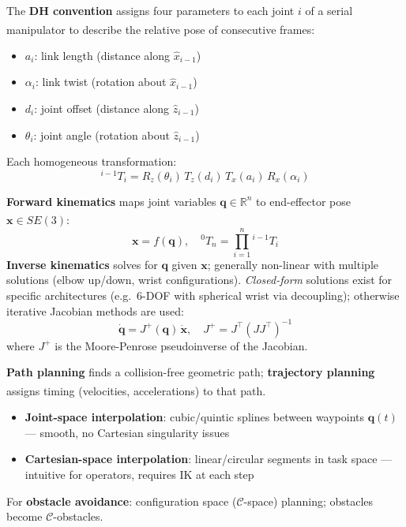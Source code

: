 \begin{tcbitemize}[ skin=sectionraster ]
    \tcbitem[title={Denavit-Hartenberg (DH) Parameters}, raster multicolumn=3]
    The \textbf{DH convention} assigns four parameters to each joint $i$ of a serial manipulator to describe the relative pose of consecutive frames\textsuperscript{\cite[][pp.~45--70]{sicilianoRobotics2009}}:
    \begin{itemize}
        \item $a_i$: link length (distance along $\hat{x}_{i-1}$)
        \item $\alpha_i$: link twist (rotation about $\hat{x}_{i-1}$)
        \item $d_i$: joint offset (distance along $\hat{z}_{i-1}$)
        \item $\theta_i$: joint angle (rotation about $\hat{z}_{i-1}$)
    \end{itemize}
    Each homogeneous transformation:
    \begin{equation}
        {}^{i-1}T_i = R_z(\theta_i)\,T_z(d_i)\,T_x(a_i)\,R_x(\alpha_i)
    \end{equation}

    \tcbitem[title={Forward and Inverse Kinematics}, raster multicolumn=3]
    \textbf{Forward kinematics} maps joint variables $\mathbf{q} \in \mathbb{R}^n$ to end-effector pose $\mathbf{x} \in SE(3)$\textsuperscript{\cite[][pp.~80--100]{sicilianoRobotics2009}}:
    \begin{equation}
        \mathbf{x} = f(\mathbf{q}), \quad {}^0T_n = \prod_{i=1}^{n} {}^{i-1}T_i
    \end{equation}
    \textbf{Inverse kinematics} solves for $\mathbf{q}$ given $\mathbf{x}$; generally non-linear with multiple solutions (elbow up/down, wrist configurations).
    \emph{Closed-form} solutions exist for specific architectures (e.g.\ 6-DOF with spherical wrist via decoupling); otherwise iterative Jacobian methods are used:
    \begin{equation}
        \dot{\mathbf{q}} = J^+(\mathbf{q})\,\dot{\mathbf{x}}, \quad J^+ = J^\top(J J^\top)^{-1}
    \end{equation}
    where $J^+$ is the Moore-Penrose pseudoinverse of the Jacobian.

    \tcbitem[title={Path and Trajectory Planning}, raster multicolumn=3]
    \textbf{Path planning} finds a collision-free geometric path; \textbf{trajectory planning} assigns timing (velocities, accelerations) to that path\textsuperscript{\cite[][pp.~170--200]{sicilianoRobotics2009}}.
    \begin{itemize}
        \item \textbf{Joint-space interpolation}: cubic/quintic splines between waypoints $\mathbf{q}(t)$ — smooth, no Cartesian singularity issues
        \item \textbf{Cartesian-space interpolation}: linear/circular segments in task space — intuitive for operators, requires IK at each step
    \end{itemize}
    For \textbf{obstacle avoidance}: configuration space ($\mathcal{C}$-space) planning; obstacles become $\mathcal{C}$-obstacles.


\end{tcbitemize}
